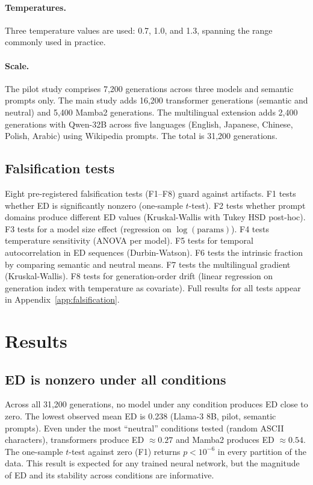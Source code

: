 \documentclass{article}
\begin{document}
\paragraph{Temperatures.}
Three temperature values are used: 0.7, 1.0, and 1.3, spanning the range commonly used in practice.

\paragraph{Scale.}
The pilot study comprises 7,200 generations across three models and semantic prompts only. The main study adds 16,200 transformer generations (semantic and neutral) and 5,400 Mamba2 generations. The multilingual extension adds 2,400 generations with Qwen-32B across five languages (English, Japanese, Chinese, Polish, Arabic) using Wikipedia prompts. The total is 31,200 generations.

\subsection{Falsification tests}

Eight pre-registered falsification tests (F1--F8) guard against artifacts. F1 tests whether ED is significantly nonzero (one-sample $t$-test). F2 tests whether prompt domains produce different ED values (Kruskal-Wallis with Tukey HSD post-hoc). F3 tests for a model size effect (regression on $\log(\text{params})$). F4 tests temperature sensitivity (ANOVA per model). F5 tests for temporal autocorrelation in ED sequences (Durbin-Watson). F6 tests the intrinsic fraction by comparing semantic and neutral means. F7 tests the multilingual gradient (Kruskal-Wallis). F8 tests for generation-order drift (linear regression on generation index with temperature as covariate). Full results for all tests appear in Appendix~\ref{app:falsification}.

\section{Results}
\label{sec:results}

\subsection{ED is nonzero under all conditions}

Across all 31,200 generations, no model under any condition produces ED close to zero. The lowest observed mean ED is 0.238 (Llama-3 8B, pilot, semantic prompts). Even under the most ``neutral'' conditions tested (random ASCII characters), transformers produce ED $\approx 0.27$ and Mamba2 produces ED $\approx 0.54$. The one-sample $t$-test against zero (F1) returns $p < 10^{-6}$ in every partition of the data. This result is expected for any trained neural network, but the magnitude of ED and its stability across conditions are informative.
\end{document}
